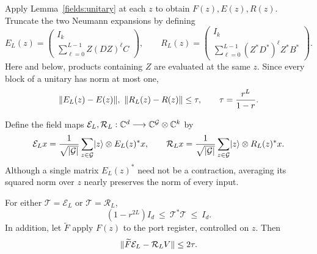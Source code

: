 Apply Lemma~\ref{fields:unitary} at each $z$ to obtain $F(z),E(z),R(z)$.
Truncate the two Neumann expansions by defining
\begin{equation}\label{fields:truncations}
 E_L(z)=\begin{pmatrix}
 I_k\\[2pt] \displaystyle\sum_{\ell=0}^{L-1}Z(DZ)^\ell C
 \end{pmatrix},\qquad
 R_L(z)=\begin{pmatrix}
 I_k\\[2pt] \displaystyle\sum_{\ell=0}^{L-1}(Z^*D^*)^\ell Z^*B^*
 \end{pmatrix}.
\end{equation}
Here and below, products containing $Z$ are evaluated at the same $z$.
Since every block of a unitary has norm at most one,
\begin{equation}\label{fields:tails}
 \lVert E_L(z)-E(z)\rVert,\ \lVert R_L(z)-R(z)\rVert
 \le \tau,\qquad \tau=\frac{r^L}{1-r}.
\end{equation}

Define the field maps $\mathcal E_L,\mathcal R_L:
\mathbb C^d\longrightarrow\mathbb C^{\mathcal G}\otimes\mathbb C^k$ by
\begin{equation}\label{fields:maps}
 \mathcal E_L x=\frac1{\sqrt{|\mathcal G|}}
   \sum_{z\in\mathcal G}\lvert z\rangle\otimes E_L(z)^*x,
 \qquad
 \mathcal R_L x=\frac1{\sqrt{|\mathcal G|}}
   \sum_{z\in\mathcal G}\lvert z\rangle\otimes R_L(z)^*x.
\end{equation}
Although a single matrix $E_L(z)^*$ need not be a contraction,
averaging its squared norm over $z$ nearly preserves the norm of every input.

\begin{proposition}\label{fields:gram}
For either $\mathcal T=\mathcal E_L$ or $\mathcal T=\mathcal R_L$,
\begin{equation}\label{fields:gram-bound}
 (1-r^{2L})I_d\ \le\ \mathcal T^*\mathcal T\ \le\ I_d.
\end{equation}
In addition, let $\widetilde F$ apply $F(z)$ to the port register,
controlled on $z$. Then
\begin{equation}\label{fields:intertwine}
 \lVert \widetilde F\mathcal E_L-\mathcal R_L V\rVert\le2\tau.
\end{equation}
\end{proposition}

